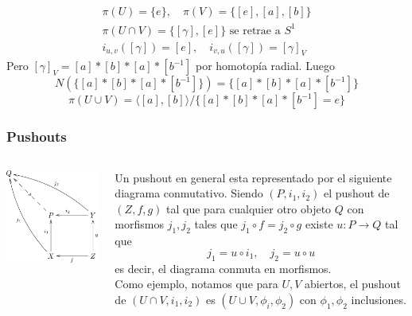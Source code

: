 \documentclass[xetex,mathserif,serif]{beamer}
\begin{document}
\begin{frame}
\begin{center}
    \end{center}
    \pause
    \begin{gather*}
      \pi (U) = \{e\}, \quad \pi (V) = \{[e], [a], [b]\} \\
      \pi (U \cap V) = \{[\gamma], [e]\} \text{ se retrae a } S^1 \\
      i_{u,v} ([\gamma]) = [e], \quad i_{v,u} ([\gamma]) = [\gamma]_V
    \end{gather*}
    Pero \([\gamma]_{V} = [a]*[b]*[a]*[b^{-1}] \) por homotopía
    radial. Luego
    \[ N \left( \{[a]*[b]*[a]*[b^{-1}]\} \right) = \{[a]*[b]*[a]*[b^{-1}]\} \]
    \[ \pi (U \cup V) = \langle [a], [b] \rangle /
      \{[a]*[b]*[a]*[b^{-1}] = e\}\]
  \end{frame}

  \begin{frame}
    \frametitle{Pushouts}
    \begin{columns}
      \begin{column}{0.35\textwidth}
        \begin{flushleft}
          \includegraphics[scale=0.9]{../tesis/imagenes/pushout.png}
        \end{flushleft}
      \end{column}
      \begin{column}{0.65\textwidth}
        Un pushout en general esta representado por el siguiente
        diagrama conmutativo.
        Siendo \((P, i_1, i_2)\) el pushout de \((Z, f, g) \) tal que
        para cualquier otro objeto \(Q\) con morfismos \(j_1, j_2\)
        tales que \( j_1 \circ f = j_2 \circ g \)
        existe \(u : P \to Q\) tal que
        \[ j_1 = u \circ i_1,\quad j_2 = u \circ u \]
        es decir, el diagrama conmuta en morfismos. \\

        Como ejemplo, notamos que para \(U,V\) abiertos, el pushout de \((U \cap V,
        i_1, i_2)\) es \((U \cup V, \phi_i , \phi_2)\) con \(\phi_1, \phi_2\)
        inclusiones.
      \end{column}
    \end{columns}
  \end{frame}
\end{document}
